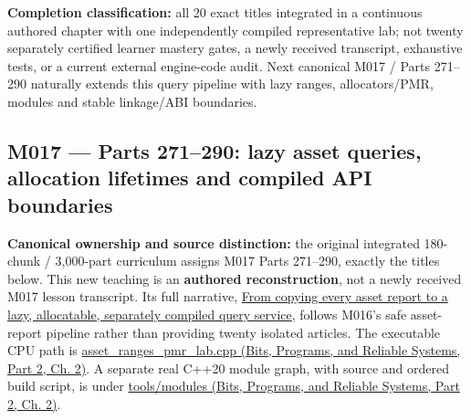 \textbf{Completion classification:} all 20 exact titles integrated in a continuous authored chapter with one independently compiled representative lab; not twenty separately certified learner mastery gates, a newly received transcript, exhaustive tests, or a current external engine-code audit. Next canonical M017 / Parts 271--290 naturally extends this query pipeline with lazy ranges, allocators/PMR, modules and stable linkage/ABI boundaries.

\subsection{M017 --- Parts 271--290: lazy asset queries, allocation lifetimes and compiled API boundaries}\label{appendix-fd090d982a15-m017-parts-271290-lazy-asset-queries-allocation-lifetimes-and-compiled-api-boundaries}

\hypertarget{appendix-fd090d982a15-m017-parts-271290-lazy-asset-queries-allocation-lifetimes-and-compiled-api-boundaries}{}

\textbf{Canonical ownership and source distinction:} the original integrated 180-chunk / 3,000-part curriculum assigns M017 Parts 271--290, exactly the titles below. This new teaching is an \textbf{authored reconstruction}, not a newly received M017 lesson transcript. Its full narrative, \hyperref[01-foundations-i-ch006-from-copying-every-asset-report-to-a-lazy-allocatable-separately-compiled-query-service]{From copying every asset report to a lazy, allocatable, separately compiled query service}, follows M016's safe asset-report pipeline rather than providing twenty isolated articles. The executable CPU path is \href{../01-Bits-Programs-and-Reliable-Systems-P02/main.pdf\#nameddest=source-file-a1c76c44bc377537c732f5c4}{asset\_ranges\_pmr\_lab.cpp (Bits, Programs, and Reliable Systems, Part 2, Ch. 2)}. A separate real C++20 module graph, with source and ordered build script, is under \href{../01-Bits-Programs-and-Reliable-Systems-P02/main.pdf\#nameddest=source-file-e1b7c3e4f52da0e7c9c36a41}{tools/modules (Bits, Programs, and Reliable Systems, Part 2, Ch. 2)}.

